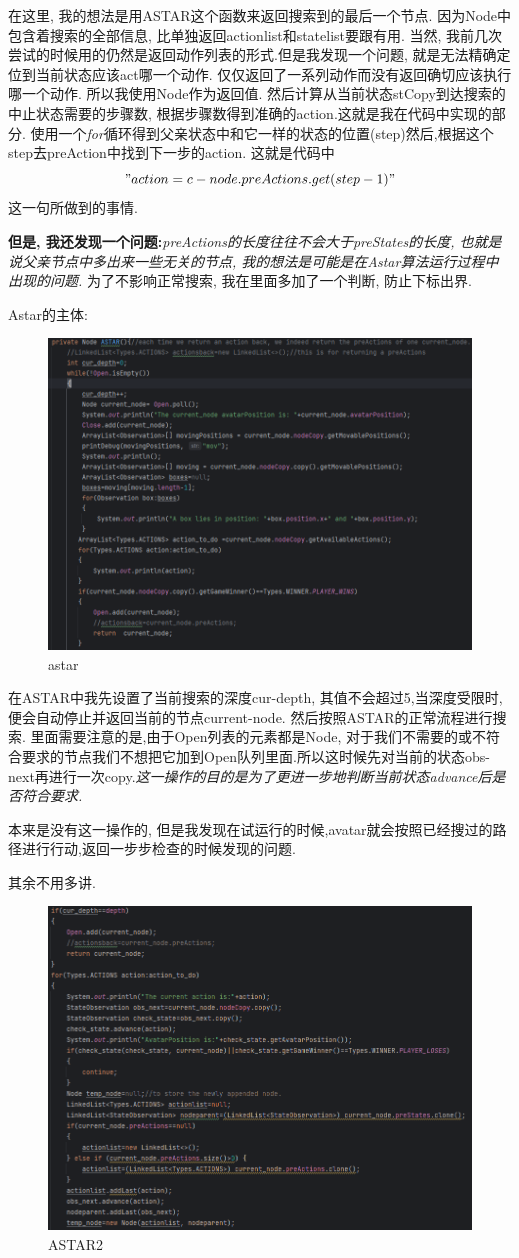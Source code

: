 \documentclass{article}
\begin{document}
在这里, 我的想法是用ASTAR这个函数来返回搜索到的最后一个节点. 因为Node中包含着搜索的全部信息, 比单独返回actionlist和statelist要跟有用. 当然, 我前几次尝试的时候用的仍然是返回动作列表的形式.但是我发现一个问题, 就是无法精确定位到当前状态应该act哪一个动作. 仅仅返回了一系列动作而没有返回确切应该执行哪一个动作. 所以我使用Node作为返回值. 然后计算从当前状态stCopy到达搜索的中止状态需要的步骤数, 根据步骤数得到准确的action.这就是我在代码中实现的部分. 使用一个\textit{for}循环得到父亲状态中和它一样的状态的位置(step)然后,根据这个step去preAction中找到下一步的action. 这就是代码中$$"action=c-node.preActions.get(step-1)"$$ 这一句所做到的事情.

\textbf{但是, 我还发现一个问题:}\textit{preActions的长度往往不会大于preStates的长度, 也就是说父亲节点中多出来一些无关的节点, 我的想法是可能是在Astar算法运行过程中出现的问题.} 为了不影响正常搜索, 我在里面多加了一个判断, 防止下标出界.

 Astar的主体:

\begin{figure}[h]
\centering
\includegraphics[width=0.5\linewidth]{Astar}
\caption{astar}
\end{figure}

在ASTAR中我先设置了当前搜索的深度cur-depth, 其值不会超过5,当深度受限时, 便会自动停止并返回当前的节点current-node.
然后按照ASTAR的正常流程进行搜索. 里面需要注意的是,由于Open列表的元素都是Node, 对于我们不需要的或不符合要求的节点我们不想把它加到Open队列里面.所以这时候先对当前的状态obs-next再进行一次copy.\textit{这一操作的目的是为了更进一步地判断当前状态advance后是否符合要求.} 

本来是没有这一操作的, 但是我发现在试运行的时候,avatar就会按照已经搜过的路径进行行动,返回一步步检查的时候发现的问题.

其余不用多讲.
\begin{figure}
\centering
\includegraphics[width=0.5\linewidth]{ASTAR2}
\caption{ASTAR2}
\end{figure}
\end{document}
